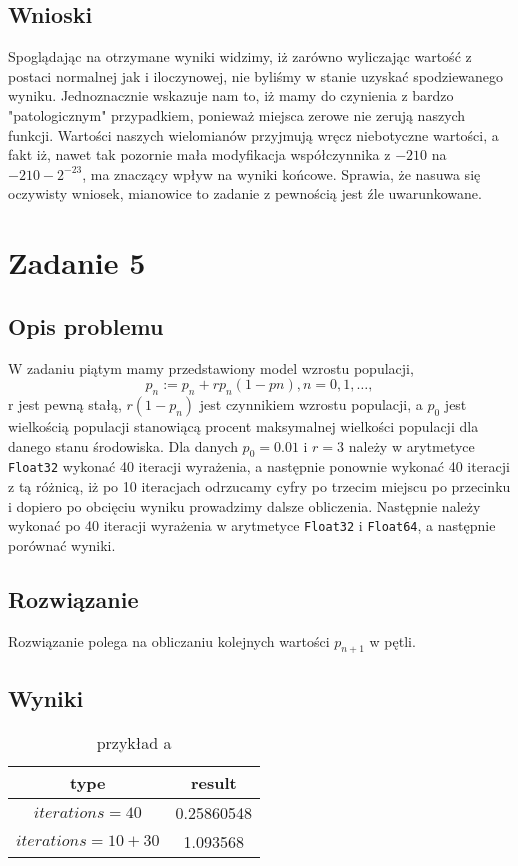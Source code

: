 \documentclass{article}
\begin{document}
\begin{center}
    \subsection{Wnioski}
    \large Spoglądając na otrzymane wyniki widzimy, iż zarówno wyliczając wartość z postaci normalnej jak i iloczynowej, nie byliśmy w stanie uzyskać spodziewanego wyniku.
     Jednoznacznie wskazuje nam to, iż mamy do czynienia z bardzo "patologicznym" przypadkiem, ponieważ miejsca zerowe nie zerują naszych funkcji.
     Wartości naszych wielomianów przyjmują wręcz niebotyczne wartości, a fakt iż, nawet tak pozornie mała modyfikacja współczynnika z \(-210\) na \(-210-2^{-23}\), ma znaczący wpływ na wyniki końcowe.
     Sprawia, że nasuwa się oczywisty wniosek, mianowice to zadanie z pewnością jest źle uwarunkowane.   

    \section{Zadanie 5}
    \subsection{Opis problemu}
    \large W zadaniu piątym mamy przedstawiony model wzrostu populacji, 
    \[ p_{n} := p_{n} + rp_{n}(1 - p{n}), n = 0,1,\ldots, \]
    r jest pewną stałą, \(r(1 - p_{n})\) jest czynnikiem wzrostu populacji, a \(p_{0}\) jest wielkością 
    populacji stanowiącą procent maksymalnej wielkości populacji dla danego stanu środowiska.
    Dla danych \(p_{0} = 0.01\) i \(r = 3\) należy w arytmetyce \texttt{Float32} 
    wykonać 40 iteracji wyrażenia, a następnie ponownie wykonać 40 iteracji z tą różnicą, iż po 10 iteracjach 
    odrzucamy cyfry po trzecim miejscu po przecinku i dopiero po obcięciu wyniku prowadzimy dalsze obliczenia. 
    Następnie należy wykonać po 40 iteracji wyrażenia w arytmetyce \texttt{Float32} i \texttt{Float64}, a następnie porównać wyniki.

    \subsection{Rozwiązanie}
    \large Rozwiązanie polega na obliczaniu kolejnych wartości \(p_{n+1}\) w pętli.
    \subsection{Wyniki}
    \begin{table}[h!]
    \centering
    \begin{tabular}{||c c||} 
    \hline
    \textbf{type} & \textbf{result}\\ [0.5ex]
    \hline\hline
    \texttt{\(iterations = 40\)} & 0.25860548  \\ 
    \texttt{\(iterations = 10 + 30\)} & 1.093568 \\
    \hline
    \end{tabular}
    \caption{przykład a}
    \label{table:7}
    \end{table}


\end{center}
\end{document}
